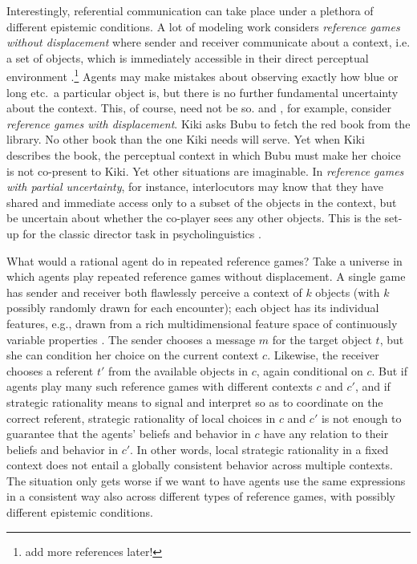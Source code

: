 \documentclass[a4paper]{article}
\begin{document}
Interestingly, referential communication can take place under a plethora of different epistemic conditions. A lot of modeling work considers \emph{reference games without displacement} where sender and receiver communicate about a context, i.e. a set of objects, which is immediately accessible in their direct perceptual environment \parencite{BaronchelliGong2010:Modeling-the-Em,Franke2012:Scales-Salience,Franke2012:On-Scales-Salie}.\footnote{add more references later!} Agents may make mistakes about observing exactly how blue or long etc.~a particular object is, but there is no further fundamental uncertainty about the context. This, of course, need not be so. \textcite{lipman_why_2009} and \textcite{Deemter2009:Utility-and-Lan}, for example, consider \emph{reference games with displacement}. Kiki asks Bubu to fetch the red book from the library. No other book than the one Kiki needs will serve. Yet when Kiki describes the book, the perceptual context in which Bubu must make her choice is not co-present to Kiki. Yet other situations are imaginable. In \emph{reference games with partial uncertainty}, for instance, interlocutors may know that they have shared and immediate access only to a subset of the objects in the context, but be uncertain about whether the co-player sees any other objects. This is the set-up for the classic director task in psycholinguistics \parencite[\emph{e.g.}][]{KraussGlucksberg1977:Social-and-nons,Keysar2000,KeyzarLin2003:Limits-on-Theor}.

What would a rational agent do in repeated reference games? Take a universe in which agents play repeated reference games without displacement. A single game has sender and receiver both flawlessly perceive a context of $k$ objects (with $k$ possibly randomly drawn for each encounter); each object has its individual features, e.g., drawn from a rich multidimensional feature space of continuously variable properties \parencite[\emph{e.g.}][]{Franke2012:Scales-Salience,Franke2012:On-Scales-Salie}. The sender chooses a message $m$ for the target object $t$, but she can condition her choice on the current context $c$. Likewise, the receiver chooses a referent $t'$ from the available objects in $c$, again conditional on $c$. But if agents play many such reference games with different contexts $c$ and $c'$, and if strategic rationality means to signal and interpret so as to coordinate on the correct referent, strategic rationality of local choices in $c$ and $c'$ is not enough to guarantee that the agents' beliefs and behavior in $c$ have any relation to their beliefs and behavior in $c'$. In other words, local strategic rationality in a fixed context does not entail a globally consistent behavior across multiple contexts. The situation only gets worse if we want to have agents use the same expressions in a consistent way also across different types of reference games, with possibly different epistemic conditions. 
\end{document}
